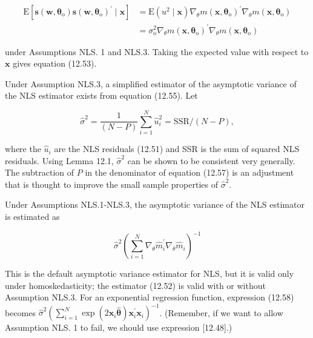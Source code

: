 \documentclass[10pt]{article}
\begin{document}
\begin{align*}
\mathrm{E}\left[\mathbf{s}\left(\mathbf{w}, \boldsymbol{\theta}_{\mathrm{o}}\right) \mathbf{s}\left(\mathbf{w}, \boldsymbol{\theta}_{\mathrm{o}}\right)^{\prime} \mid \mathbf{x}\right] & =\mathrm{E}\left(u^{2} \mid \mathbf{x}\right) \nabla_{\theta} m\left(\mathbf{x}, \boldsymbol{\theta}_{\mathrm{o}}\right)^{\prime} \nabla_{\theta} m\left(\mathbf{x}, \boldsymbol{\theta}_{\mathrm{o}}\right) \\
& =\sigma_{\mathrm{o}}^{2} \nabla_{\theta} m\left(\mathbf{x}, \boldsymbol{\theta}_{\mathrm{o}}\right)^{\prime} \nabla_{\theta} m\left(\mathbf{x}, \boldsymbol{\theta}_{\mathrm{o}}\right) \tag{12.56}
\end{align*}


under Assumptions NLS. 1 and NLS.3. Taking the expected value with respect to $\mathbf{x}$ gives equation (12.53).

Under Assumption NLS.3, a simplified estimator of the asymptotic variance of the NLS estimator exists from equation (12.55). Let


\begin{equation*}
\hat{\sigma}^{2}=\frac{1}{(N-P)} \sum_{i=1}^{N} \hat{u}_{i}^{2}=\mathrm{SSR} /(N-P), \tag{12.57}
\end{equation*}


where the $\hat{u}_{i}$ are the NLS residuals (12.51) and SSR is the sum of squared NLS residuals. Using Lemma 12.1, $\hat{\sigma}^{2}$ can be shown to be consistent very generally. The subtraction of $P$ in the denominator of equation (12.57) is an adjustment that is thought to improve the small sample properties of $\hat{\sigma}^{2}$.

Under Assumptions NLS.1-NLS.3, the asymptotic variance of the NLS estimator is estimated as


\begin{equation*}
\hat{\sigma}^{2}\left(\sum_{i=1}^{N} \nabla_{\theta} \hat{m}_{i}^{\prime} \nabla_{\theta} \hat{m}_{i}\right)^{-1} \tag{12.58}
\end{equation*}


This is the default asymptotic variance estimator for NLS, but it is valid only under homoskedasticity; the estimator (12.52) is valid with or without Assumption NLS.3. For an exponential regression function, expression (12.58) becomes $\hat{\sigma}^{2}\left(\sum_{i=1}^{N} \exp \left(2 \mathbf{x}_{i} \hat{\boldsymbol{\theta}}\right) \mathbf{x}_{i}^{\prime} \mathbf{x}_{i}\right)^{-1}$. (Remember, if we want to allow Assumption NLS. 1 to fail, we should use expression [12.48].)
\end{document}
